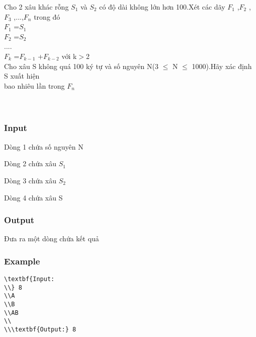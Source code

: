 



   Cho 2 xâu khác rỗng $S_{1}$   và $S_{2}$   có độ dài không lớn hơn 100.Xét các dãy $F_{1}$   ,$F_{2}$   ,$F_{3}$   ,...,$F_{n}$   trong đó   
\\   $F_{1}$   =$S_{1}$
\\   $F_{2}$   =$S_{2}$
\\   ....   
\\   $F_{k}$   =$F_{k-1}$   +$F_{k-2}$   với k$>$2   
\\   Cho xâu S không quá 100 ký tự và số nguyên N(3 $\le$ N $\le$ 1000).Hãy xác định S xuất hiện   
\\   bao nhiêu lần trong $F_{n}$
\\
\\
\\

\subsubsection{   Input  }

   Dòng 1 chứa số nguyên N  

   Dòng 2 chứa xâu $S_{1}$

   Dòng 3 chứa xâu $S_{2}$

   Dòng 4 chứa xâu S  

\subsubsection{   Output  }

   Đưa ra một dòng chứa kết quả  

\subsubsection{   Example  }
\begin{verbatim}
\textbf{Input:
\\} 8
\\A
\\B
\\AB
\\
\\\textbf{Output:} 8 \end{verbatim}
